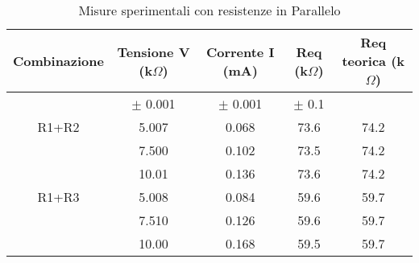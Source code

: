 \begin{table}[H]
\caption{Misure sperimentali con resistenze in Parallelo}
\begin{tabular}{|c|c|c|c|c|}
\hline
    Combinazione & Tensione V (k$\Omega$) & Corrente I (mA) & Req (k$\Omega$) & Req teorica (k$\Omega$) \\ \hline
     & $\pm$ 0.001 &  $\pm$ 0.001 & $\pm$ 0.1 & \\ 
    \hline
    R1+R2   & 5.007 & 0.068 & 73.6 & 74.2 \\
            & 7.500 & 0.102 & 73.5 & 74.2 \\ 
            & 10.01 & 0.136 & 73.6 & 74.2 \\  \hline
    R1+R3   & 5.008 & 0.084 & 59.6 & 59.7 \\ 
            & 7.510 & 0.126 & 59.6 & 59.7 \\ 
            & 10.00 & 0.168 & 59.5 & 59.7 \\ \hline
\end{tabular}
\label{}
\end{table}